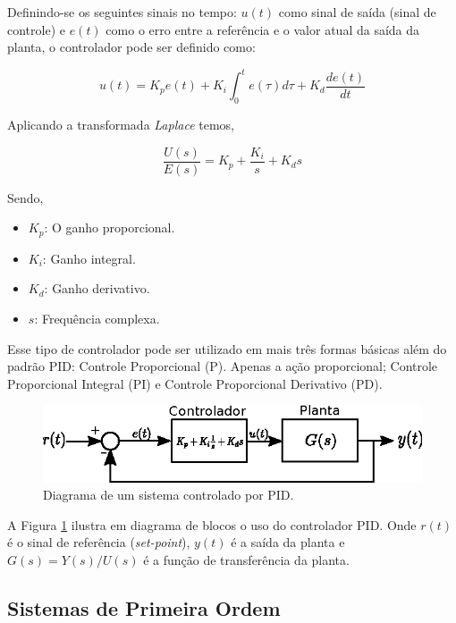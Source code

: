 Definindo-se os seguintes sinais no tempo: $u(t)$ como sinal de saída (sinal de controle) e $e(t)$ como o erro entre a referência e o valor atual da saída da planta, o controlador pode ser definido como:

\begin{equation}
    u(t) = K_{p}e(t) + K_{i} \int^{t}_{0}e(\tau)d\tau + K_{d}\frac{d e(t)}{dt}
\end{equation}

Aplicando a transformada \emph{Laplace} temos,

\begin{equation}
    \frac{U(s)}{E(s)} = K_{p} + \frac{K_{i}}{s} + K_{d}s
\end{equation}

Sendo,

\begin{itemize}
    \item $K_p$: O ganho proporcional.
    \item $K_i$: Ganho integral.
    \item $K_d$: Ganho derivativo.
    \item $s$: Frequência complexa.
\end{itemize}

Esse tipo de controlador pode ser utilizado em mais três formas básicas além do padrão PID: Controle Proporcional (P). Apenas a ação proporcional; Controle Proporcional Integral (PI) e Controle Proporcional Derivativo (PD).

\begin{figure}[H]
    \centering
    \includegraphics[width=\textwidth]{figuras/ilustracoes/diagrama_controlador_PID.eps}
    \caption{Diagrama de um sistema controlado por PID.}
    \label{fig:diagrama_controlador_PID}
\end{figure}

A Figura \ref{fig:diagrama_controlador_PID} ilustra em diagrama de blocos o uso do controlador PID. Onde $r(t)$ é o sinal de referência (\emph{set-point}), $y(t)$ é a saída da planta e $G(s) = Y(s)/U(s)$ é a função de transferência da planta.

\subsection{Sistemas de Primeira Ordem}

